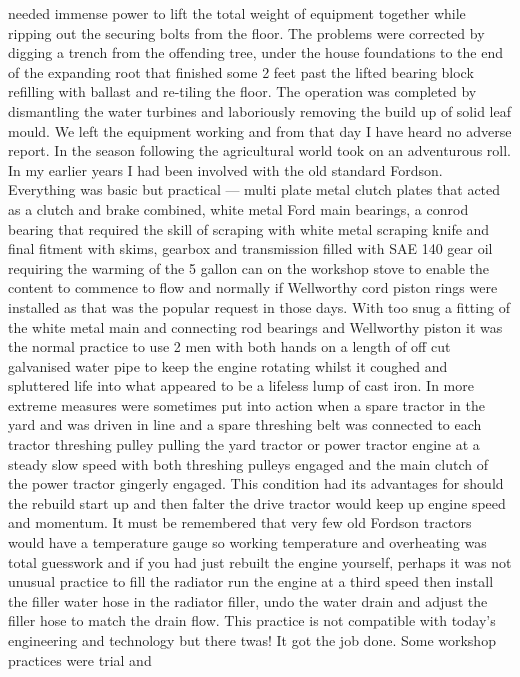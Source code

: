 needed immense power to lift the total weight of equipment together while
ripping out the securing bolts from the floor. The problems were corrected by
digging a trench from the offending tree, under the house foundations to the
end of the expanding root that finished some 2 feet past the lifted bearing
block refilling with ballast and re-tiling the floor. The operation was
completed by dismantling the water turbines and laboriously removing the build
up of solid leaf mould. We left the equipment working and from that day I have
heard no adverse report. In the season following the agricultural world took on
an adventurous roll. In my earlier years I had been involved with the old
standard Fordson. Everything was basic but practical --- multi plate metal
clutch plates that acted as a clutch and brake combined, white metal Ford main
bearings, a conrod bearing that required the skill of scraping with white metal
scraping knife and final fitment with skims, gearbox and transmission filled
with SAE 140 gear oil requiring the warming of the 5 gallon can on the workshop
stove to enable the content to commence to flow and normally if Wellworthy cord
piston rings were installed as that was the popular request in those days. With
too snug a fitting of the white metal main and connecting rod bearings and
Wellworthy piston it was the normal practice to use 2 men with both hands on a
length of off cut galvanised water pipe to keep the engine rotating whilst it
coughed and spluttered life into what appeared to be a lifeless lump of cast
iron. In more extreme measures were sometimes put into action when a spare
tractor in the yard and was driven in line and a spare threshing belt was
connected to each tractor threshing pulley pulling the yard tractor or power
tractor engine at a steady slow speed with both threshing pulleys engaged and
the main clutch of the power tractor gingerly engaged. This condition had its
advantages for should the rebuild start up and then falter the drive tractor
would keep up engine speed and momentum. It must be remembered that very few
old Fordson tractors would have a temperature gauge so working temperature and
overheating was total guesswork and if you had just rebuilt the engine
yourself, perhaps it was not unusual practice to fill the radiator run the
engine at a third speed then install the filler water hose in the radiator
filler, undo the water drain and adjust the filler hose to match the drain
flow. This practice is not compatible with today's engineering and technology
but there twas! It got the job done. Some workshop practices were trial and
